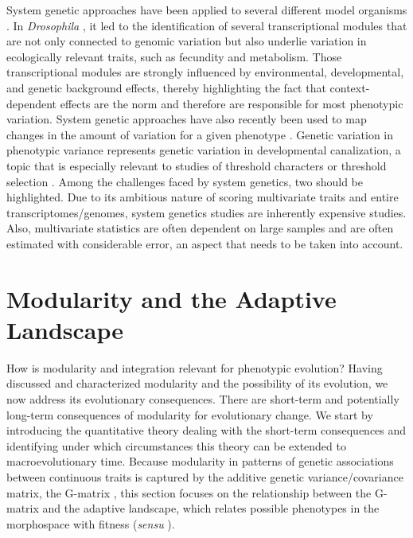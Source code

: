 \begin{refsection}
System genetic approaches have been applied to several different model
organisms \parencite{Ihmels2002-fg, Juenger2005-uc, Wang2010-da}. In
\emph{Drosophila} \textcite{Ayroles2009-ld}, it led to the identification of several transcriptional modules
that are not only connected to genomic variation but also underlie
variation in ecologically relevant traits, such as fecundity and
metabolism. Those transcriptional modules are strongly influenced by
environmental, developmental, and genetic background effects, thereby
highlighting the fact that context-dependent effects are the norm and
therefore are responsible for most phenotypic variation. System genetic
approaches have also recently been used to map changes in the amount of
variation for a given phenotype \parencite{Ayroles2015-ab}. Genetic variation in phenotypic variance represents
genetic variation in developmental canalization, a topic that is
especially relevant to studies of threshold characters or threshold
selection \parencite{Ayroles2015-ab}. Among
the challenges faced by system genetics, two should be highlighted. Due
to its ambitious nature of scoring multivariate traits and entire
transcriptomes/genomes, system genetics studies are inherently expensive
studies. Also, multivariate statistics are often dependent on large
samples and are often estimated with considerable error, an aspect that
needs to be taken into account.

\section{Modularity and the Adaptive Landscape}

How is modularity and integration relevant for phenotypic evolution?
Having discussed and characterized modularity and the possibility of its
evolution, we now address its evolutionary consequences. There are
short-term and potentially long-term consequences of modularity for
evolutionary change. We start by introducing the quantitative theory
dealing with the short-term consequences and identifying under which
circumstances this theory can be extended to macroevolutionary time.
Because modularity in patterns of genetic associations between
continuous traits is captured by the additive genetic
variance/covariance matrix, the G-matrix \parencite{Lande1979-by}, this section focuses on
the relationship between the G-matrix and the adaptive landscape, which
relates possible phenotypes in the morphospace with fitness
(\emph{sensu} \textcite{Simpson1944-pf, Arnold2001-lz}).


\end{refsection}
